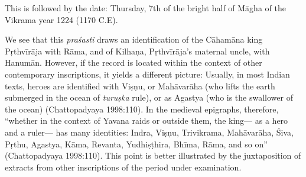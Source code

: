 This is followed by the date: Thursday, 7th of the bright half of Māgha of the Vikrama year 1224 (1170 C.E).

We see that this {\sl praśasti} draws an identification of the Cāhamāna king Pṛthvīrāja with Rāma, and of Kilhaṇa, Pṛthvīrāja’s maternal uncle, with Hanumān. However, if the record is located within the context of other contemporary inscriptions, it yields a different picture: Usually, in most Indian texts, heroes are identified with Viṣṇu, or Mahāvarāha (who lifts the earth submerged in the ocean of {\sl turuṣka} rule), or as Agastya (who is the swallower of the ocean) (Chattopadyaya 1998:110). In the medieval epigraphs, therefore, “whether in the context of Yavana raids or outside them, the king— as a hero and a ruler— has many identities: Indra, Viṣṇu, Trivikrama, Mahāvarāha, Śiva, Pṛthu, Agastya, Kāma, Revanta, Yudhiṣṭhira, Bhīma, Rāma, and so on” (Chattopadyaya 1998:110). This point is better illustrated by the juxtaposition of extracts from other inscriptions of the period under examination. 

\newpage

